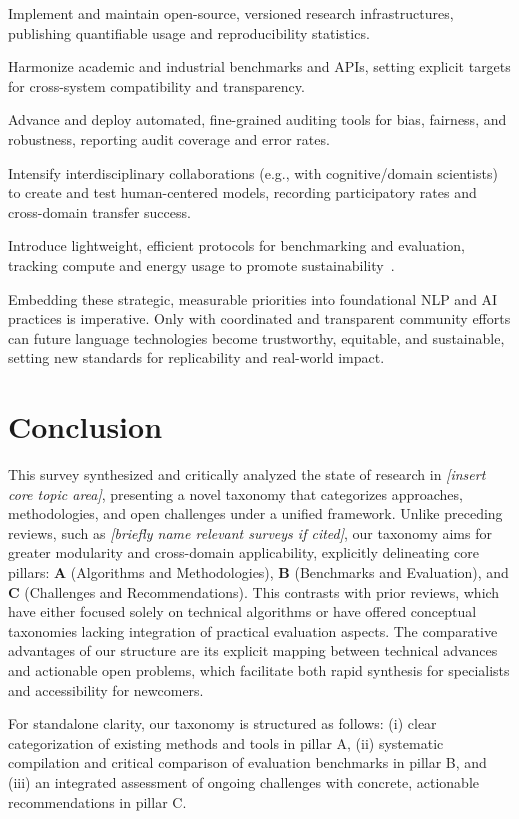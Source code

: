 \documentclass[sigconf]{acmart}
\begin{document}
Implement and maintain open-source, versioned research infrastructures, publishing quantifiable usage and reproducibility statistics.

Harmonize academic and industrial benchmarks and APIs, setting explicit targets for cross-system compatibility and transparency.

Advance and deploy automated, fine-grained auditing tools for bias, fairness, and robustness, reporting audit coverage and error rates.

Intensify interdisciplinary collaborations (e.g., with cognitive/domain scientists) to create and test human-centered models, recording participatory rates and cross-domain transfer success.

Introduce lightweight, efficient protocols for benchmarking and evaluation, tracking compute and energy usage to promote sustainability~\cite{ref13,ref34,ref46,ref47,ref55,ref66,ref68,ref70,ref71,ref88,ref101,ref104,ref106,ref107,ref108}.

Embedding these strategic, measurable priorities into foundational NLP and AI practices is imperative. Only with coordinated and transparent community efforts can future language technologies become trustworthy, equitable, and sustainable, setting new standards for replicability and real-world impact.

\section{Conclusion}
This survey synthesized and critically analyzed the state of research in \emph{[insert core topic area]}, presenting a novel taxonomy that categorizes approaches, methodologies, and open challenges under a unified framework. Unlike preceding reviews, such as \emph{[briefly name relevant surveys if cited]}, our taxonomy aims for greater modularity and cross-domain applicability, explicitly delineating core pillars: \textbf{A} (Algorithms and Methodologies), \textbf{B} (Benchmarks and Evaluation), and \textbf{C} (Challenges and Recommendations). This contrasts with prior reviews, which have either focused solely on technical algorithms or have offered conceptual taxonomies lacking integration of practical evaluation aspects. The comparative advantages of our structure are its explicit mapping between technical advances and actionable open problems, which facilitate both rapid synthesis for specialists and accessibility for newcomers.

For standalone clarity, our taxonomy is structured as follows: (i) clear categorization of existing methods and tools in pillar A, (ii) systematic compilation and critical comparison of evaluation benchmarks in pillar B, and (iii) an integrated assessment of ongoing challenges with concrete, actionable recommendations in pillar C.
\end{document}
